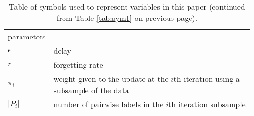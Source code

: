 \begin{table}
\begin{tabularx}{\columnwidth}{p{1.7cm} X }
 parameters \\
 $\epsilon$ & delay \\
 $r$ & forgetting rate \\
 $\pi_i$ & weight given to the update at the $i$th iteration using a subsample of the data \\
 $|P_i|$ & number of pairwise labels in the $i$th iteration subsample \\
 \bottomrule
 \end{tabularx}
 \caption{Table of symbols used to represent variables in this paper (continued from Table \ref{tab:sym1} on previous page).}
 \label{tab:sym2}
\end{table}